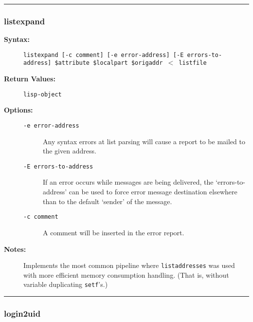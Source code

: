 \hrule
\subsubsection{listexpand}

\begin{description}
\item[{\bf Syntax:}] \mbox{}

{\tt listexpand [-c comment] [-e error-address] [-E errors-to-address] \$attribute \$localpart \$origaddr {\(<\)} listfile}

\item[{\bf Return Values:}] \mbox{}

{\tt lisp-object}

\item[{\bf Options:}] \mbox{}

\begin{description}
\item[{\tt -e error-address}] \mbox{}

Any syntax errors at list 
parsing will cause a report to be mailed to the given address.

\item[{\tt -E errors-to-address}] \mbox{}

If an error occurs while messages 
are being delivered, the `errors-to-address' can be used to force error 
message destination elsewhere than to the default `sender' of the message.

\item[{\tt -c comment}] \mbox{}

A comment will be inserted in the error report.

\end{description}


\item[{\bf Notes:}] \mbox{}

Implements the most common pipeline where 
{\tt listaddresses} was used with more efficient memory consumption 
handling. (That is, without variable duplicating {\tt setf}'s.)

\end{description}


\hrule
\subsubsection{login2uid}

